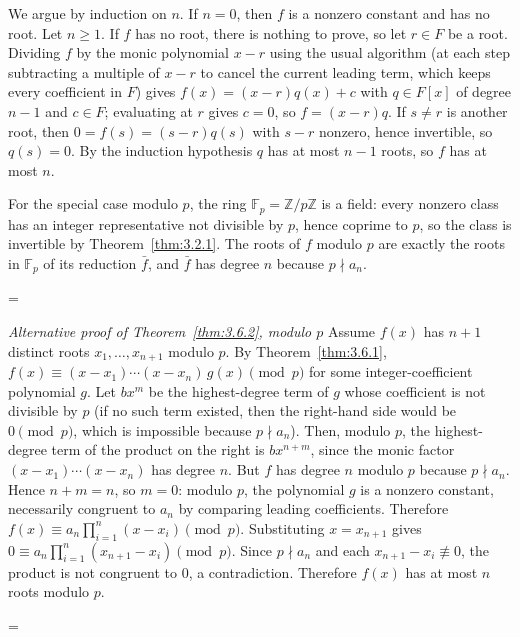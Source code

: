 \documentclass[11pt]{article}
\makeatletter
\theoremstyle{ntstyle}
\let\nt@closedisplay\]
\def\nt@guardedclose{\@ifnextchar\par{\nt@closeafterpar}{\@ifnextchar\end{\postdisplaypenalty\@M\nt@closedisplay}{\nt@closedisplay}}}
\def\nt@closeafterpar\par{\@ifnextchar\par{\nt@closeafterpar}{\@ifnextchar\end{\postdisplaypenalty\@M\nt@closedisplay\par}{\nt@closedisplay\par}}}
\renewenvironment{proof}[1][\proofname]{\par
  \pushQED{\qed}\normalfont\topsep\medskipamount\edef\nt@afterproof{\@endparpenalty=\the\@endparpenalty\relax}\@beginparpenalty\@M\@endparpenalty\@M\let\]\nt@guardedclose\trivlist\item[]\textit{#1\@addpunct{.}} \ignorespaces}{\ifvmode\addpenalty\@M\fi\popQED\nt@afterproof\endtrivlist\@endpefalse}
\newenvironment{altproof}[1][\proofname]{\begin{proof}[#1]\renewcommand{\qedsymbol}{}}{\end{proof}}
\makeatother
\begin{document}
\begin{proof} We argue by induction on $n$. If $n=0$, then $f$ is a nonzero constant
	and has no root. Let $n\ge1$. If $f$ has no root, there is nothing to prove,
	so let $r\in F$ be a root. Dividing $f$ by the monic polynomial $x-r$ using the
	usual algorithm (at each step subtracting a multiple of $x-r$ to cancel
	the current leading term, which keeps every coefficient in $F$) gives
	$f(x)=(x-r)q(x)+c$ with $q\in F[x]$ of degree $n-1$ and $c\in F$; evaluating
	at $r$ gives $c=0$, so $f=(x-r)q$. If $s\neq r$ is another root, then
	$0=f(s)=(s-r)q(s)$ with $s-r$ nonzero, hence invertible, so $q(s)=0$. By the
	induction hypothesis $q$ has at most $n-1$ roots, so $f$ has at most $n$.

	For the special case modulo $p$, the ring $\mathbb{F}_p=\mathbb{Z}/p\mathbb{Z}$ is a field:
	every nonzero class has an integer representative not divisible by $p$,
	hence coprime to $p$, so the class is invertible by
	Theorem~\ref{thm:3.2.1}. The roots of $f$ modulo $p$ are exactly the
	roots in $\mathbb{F}_p$ of its reduction $\bar f$, and $\bar f$ has degree
	$n$ because $p\nmid a_n$.

\end{proof}
\begin{altproof}[Alternative proof of Theorem~\ref{thm:3.6.2}, modulo $p$] Assume $f(x)$ has $n+1$ distinct roots
	$x_1, \ldots, x_{n+1}$ modulo $p$. By Theorem~\ref{thm:3.6.1}, $f(x) \equiv (x
		- x_1) \cdots (x - x_n)\, g(x) \pmod{p}$ for some integer-coefficient
	polynomial $g$. Let $b x^m$ be the highest-degree term of $g$ whose
	coefficient is not divisible by $p$ (if no such term existed, then the
	right-hand side would be $0 \pmod{p}$, which is impossible because $p\nmid a_n$).
	Then, modulo $p$, the highest-degree term of the product on the right is
	$b x^{n+m}$, since the monic factor $(x-x_1)\cdots(x-x_n)$ has degree
	$n$. But $f$ has degree $n$ modulo $p$ because $p\nmid a_n$. Hence
	$n+m=n$, so $m=0$: modulo $p$, the polynomial $g$ is a nonzero constant, necessarily
	congruent to $a_n$ by comparing leading coefficients. Therefore
	$f(x) \equiv a_n \prod_{i=1}^{n}(x - x_i) \pmod{p}$. Substituting
	$x = x_{n+1}$ gives $0 \equiv a_n \prod_{i=1}^{n}(x_{n+1} - x_i)
		\pmod{p}$. Since $p \nmid a_n$ and each $x_{n+1} - x_i \not\equiv 0$,
	the product is not congruent to $0$, a contradiction. Therefore $f(x)$ has
	at most $n$ roots modulo $p$.

\end{altproof}
\clearpage
\end{document}
